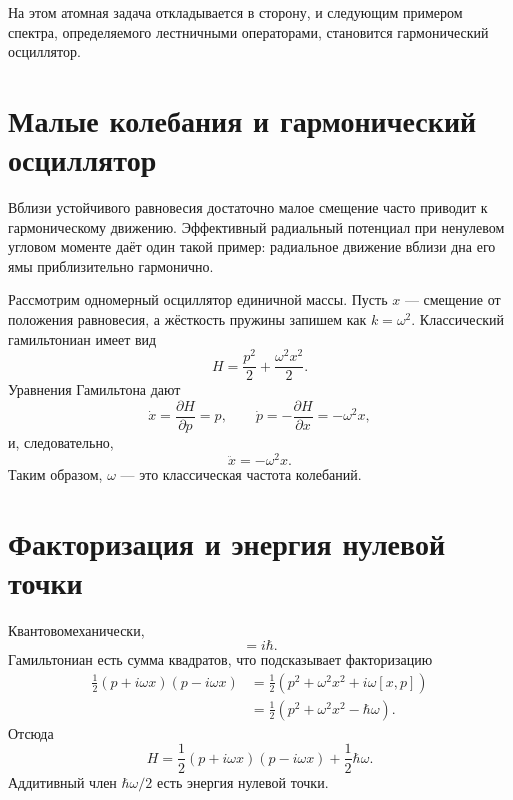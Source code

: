 На этом атомная задача откладывается в сторону, и следующим примером спектра, определяемого лестничными операторами, становится гармонический осциллятор.

\section{Малые колебания и гармонический осциллятор}

Вблизи устойчивого равновесия достаточно малое смещение часто приводит к гармоническому движению. Эффективный радиальный потенциал при ненулевом угловом моменте даёт один такой пример: радиальное движение вблизи дна его ямы приблизительно гармонично.

Рассмотрим одномерный осциллятор единичной массы. Пусть \(x\) — смещение от положения равновесия, а жёсткость пружины запишем как \(k=\omega^2\). Классический гамильтониан имеет вид
\begin{equation}
H=\frac{p^2}{2}+\frac{\omega^2x^2}{2}.
\end{equation}
Уравнения Гамильтона дают
\begin{equation}
\dot{x}=\frac{\partial H}{\partial p}=p,
\qquad
\dot{p}=-\frac{\partial H}{\partial x}=-\omega^2x,
\end{equation}
и, следовательно,
\begin{equation}
\ddot{x}=-\omega^2x.
\end{equation}
Таким образом, \(\omega\) — это классическая частота колебаний.

\section{Факторизация и энергия нулевой точки}

Квантовомеханически,
\begin{equation}
[x,p]=i\hbar.
\end{equation}
Гамильтониан есть сумма квадратов, что подсказывает факторизацию
\begin{align}
\frac{1}{2}(p+i\omega x)(p-i\omega x)
&=\frac{1}{2}\left(p^2+\omega^2x^2+i\omega[x,p]\right) \\
&=\frac{1}{2}\left(p^2+\omega^2x^2-\hbar\omega\right).
\end{align}
Отсюда
\begin{equation}
H=\frac{1}{2}(p+i\omega x)(p-i\omega x)
+\frac{1}{2}\hbar\omega.
\end{equation}
Аддитивный член \(\hbar\omega/2\) есть энергия нулевой точки.

